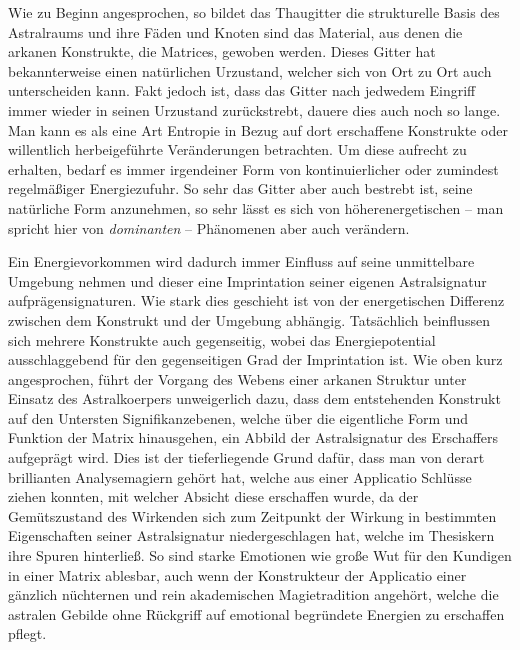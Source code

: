 \documentclass[a5paper,8pt]{book}
\begin{document}
\begin{multicols}{2}
Wie zu Beginn angesprochen, so bildet das Thaugitter die strukturelle Basis des Astralraums und ihre Fäden und Knoten
sind das Material, aus denen die arkanen Konstrukte, die Matrices, gewoben werden. Dieses Gitter hat
bekannterweise einen natürlichen Urzustand, welcher sich von Ort zu Ort auch unterscheiden kann. Fakt jedoch ist, dass das Gitter nach
jedwedem Eingriff immer wieder in seinen Urzustand zurückstrebt, dauere dies auch noch so lange. Man kann es als eine
Art Entropie in Bezug auf dort erschaffene Konstrukte oder willentlich herbeigeführte Veränderungen betrachten. Um diese
aufrecht zu erhalten, bedarf es immer irgendeiner Form von kontinuierlicher oder zumindest regelmäßiger Energiezufuhr.
So sehr das Gitter aber auch bestrebt ist, seine natürliche Form anzunehmen, so sehr lässt es sich von
höherenergetischen -- man spricht hier von \textit{dominanten} -- Phänomenen aber auch verändern.

Ein Energievorkommen wird dadurch immer Einfluss auf seine unmittelbare Umgebung nehmen und dieser eine
Imprintation seiner eigenen Astralsignatur aufprägensignaturen. Wie stark dies geschieht ist von
der energetischen Differenz zwischen dem Konstrukt und der Umgebung abhängig. Tatsächlich beinflussen sich mehrere
Konstrukte auch gegenseitig, wobei das Energiepotential ausschlaggebend für den gegenseitigen Grad der
Imprintation ist. Wie oben kurz angesprochen, führt der Vorgang des Webens einer arkanen Struktur unter Einsatz
des Astralkoerpers unweigerlich dazu, dass dem entstehenden Konstrukt auf den Untersten Signifikanzebenen,
welche über die eigentliche Form und Funktion der Matrix hinausgehen, ein Abbild der Astralsignatur des
Erschaffers aufgeprägt wird. Dies ist der tieferliegende Grund dafür, dass man von derart brillianten Analysemagiern
gehört hat, welche aus einer Applicatio Schlüsse ziehen konnten, mit welcher Absicht diese erschaffen wurde, da der
Gemütszustand des Wirkenden sich zum Zeitpunkt der Wirkung in bestimmten Eigenschaften seiner
Astralsignatur niedergeschlagen hat, welche im Thesiskern ihre Spuren hinterließ. So sind starke Emotionen
wie große Wut für den Kundigen in einer Matrix ablesbar, auch wenn der Konstrukteur der Applicatio einer gänzlich
nüchternen und rein akademischen Magietradition angehört, welche die astralen Gebilde ohne Rückgriff auf emotional
begründete Energien zu erschaffen pflegt.


\end{multicols}
\end{document}
